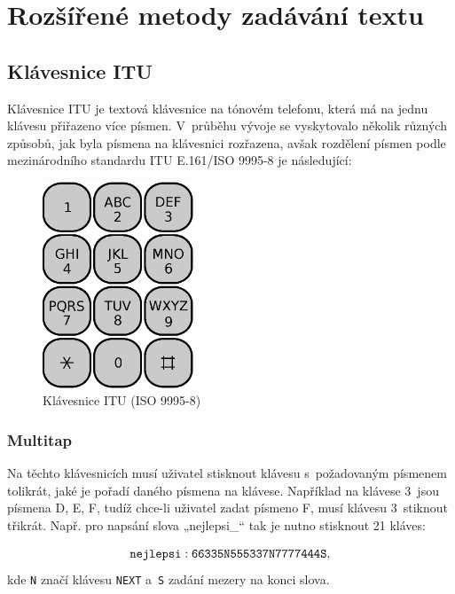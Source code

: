 \documentclass[a4paper,11pt,openany]{book} %
\begin{document}
\chapter{Rozšířené metody zadávání textu}\label{input-methods}

\section{Klávesnice ITU}\label{itu-kb}

Klávesnice ITU je textová klávesnice na tónovém telefonu, která má na jednu klávesu přiřazeno více písmen. V~průběhu vývoje se vyskytovalo několik různých způsobů, jak byla písmena na klávesnici rozřazena, avšak rozdělení písmen podle mezinárodního standardu ITU E.161/ISO 9995-8 je následující: %

\begin{figure}[h]
	\centering
	\includegraphics[width=0.4\textwidth]{telephone-keypad.eps}
	\caption{Klávesnice ITU (ISO 9995-8)\protect\footnotemark}
	\label{fig:phoneKeyboard}
\end{figure}

\subsection{Multitap}

Na těchto klávesnicích musí uživatel stisknout klávesu s~požadovaným písmenem tolikrát, jaké je pořadí daného písmena na klávese. Například na klávese 3~jsou písmena D, E, F, tudíž chce-li uživatel zadat písmeno F, musí klávesu 3~stiknout třikrát. Např. pro napsání slova „nejlepsi\_“ tak je nutno stisknout 21 kláves:

\[
	{\tt nejlepsi: 66335N555337N7777444S},
\]
kde {\tt N} značí klávesu {\tt NEXT} a~{\tt S} zadání mezery na konci slova.
\end{document}
